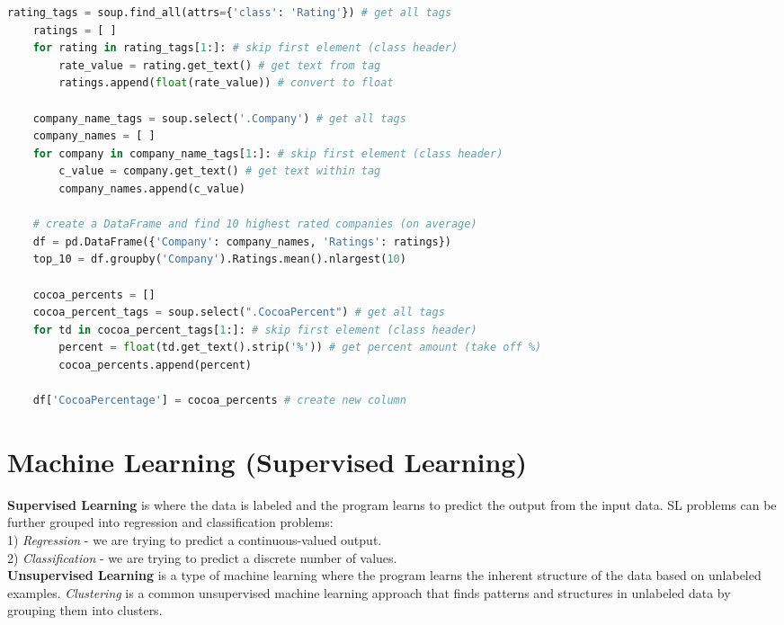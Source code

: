 \documentclass[11pt, a4paper]{article}
\begin{document}
\begin{spacing}{1.1}
\begin{lstlisting}[language=Python]
	rating_tags = soup.find_all(attrs={'class': 'Rating'}) # get all tags
	ratings = [ ]
	for rating in rating_tags[1:]: # skip first element (class header)
		rate_value = rating.get_text() # get text from tag
		ratings.append(float(rate_value)) # convert to float
	
	company_name_tags = soup.select('.Company') # get all tags
	company_names = [ ]
	for company in company_name_tags[1:]: # skip first element (class header)
		c_value = company.get_text() # get text within tag
		company_names.append(c_value)
	
	# create a DataFrame and find 10 highest rated companies (on average)
	df = pd.DataFrame({'Company': company_names, 'Ratings': ratings})
	top_10 = df.groupby('Company').Ratings.mean().nlargest(10)
	
	cocoa_percents = []
	cocoa_percent_tags = soup.select(".CocoaPercent") # get all tags
	for td in cocoa_percent_tags[1:]: # skip first element (class header)
		percent = float(td.get_text().strip('%')) # get percent amount (take off %)
		cocoa_percents.append(percent)
	
	df['CocoaPercentage'] = cocoa_percents # create new column \end{lstlisting} \newpage
	
	\section{Machine Learning (Supervised Learning)}
	\textbf{Supervised Learning} is where the data is labeled and the program learns to predict the output from the input data. SL problems can be further grouped into regression and classification problems: \vspace*{1mm} \\ 
	\hspace*{2mm} 1) \textit{Regression} - we are trying to predict a continuous-valued output. \\
	\hspace*{2mm} 2) \textit{Classification} - we are trying to predict a discrete number of values. \vspace*{2mm} \\ 
	\textbf{Unsupervised Learning} is a type of machine learning where the program learns the inherent structure of the data based on unlabeled examples. \textit{Clustering} is a common unsupervised machine learning approach that finds patterns and structures in unlabeled data by grouping them into clusters. \vspace*{1mm}

\end{spacing}
\end{document}
